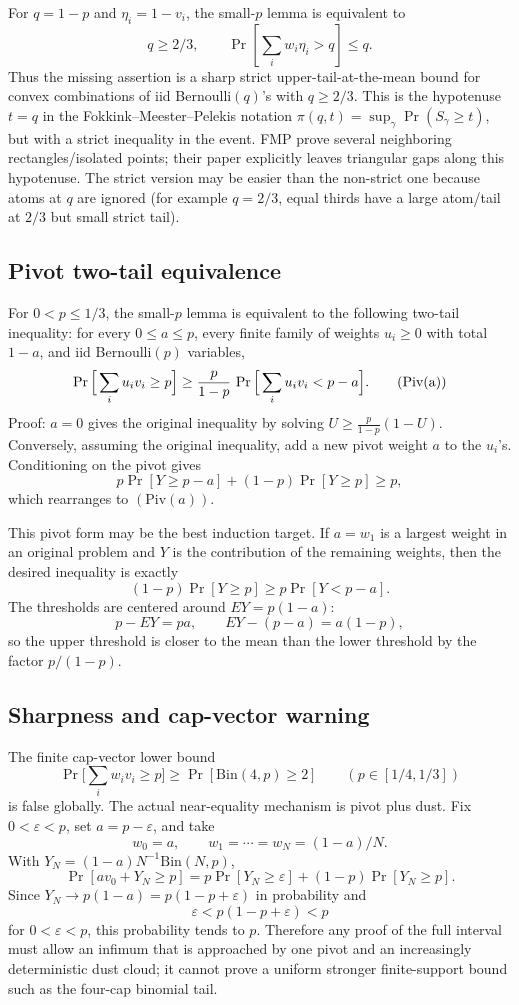 \documentclass[12pt]{article}
\begin{document}
For \(q=1-p\) and \(\eta_i=1-v_i\), the small-\(p\) lemma is equivalent to
\[
        q\ge 2/3,\qquad
        \Pr\!\left[\sum_i w_i\eta_i>q\right]\le q .
\]
Thus the missing assertion is a sharp strict upper-tail-at-the-mean bound for
convex combinations of iid Bernoulli\((q)\)'s with \(q\ge2/3\).  This is the
hypotenuse \(t=q\) in the Fokkink--Meester--Pelekis notation
\(\pi(q,t)=\sup_\gamma \Pr(S_\gamma\ge t)\), but with a strict inequality in
the event.  FMP prove several neighboring rectangles/isolated points; their
paper explicitly leaves triangular gaps along this hypotenuse.  The strict
version may be easier than the non-strict one because atoms at \(q\) are
ignored (for example \(q=2/3\), equal thirds have a large atom/tail at \(2/3\)
but small strict tail).

\subsection*{Pivot two-tail equivalence}

For \(0<p\le1/3\), the small-\(p\) lemma is equivalent to the following
two-tail inequality: for every \(0\le a\le p\), every finite family of weights
\(u_i\ge0\) with total \(1-a\), and iid Bernoulli\((p)\) variables,
\[
        \Pr\Big[\sum_i u_i v_i\ge p\Big]
        \ge {p\over 1-p}\,
        \Pr\Big[\sum_i u_i v_i<p-a\Big].        \tag{Piv(a)}
\]
Proof: \(a=0\) gives the original inequality by solving
\(U\ge\frac{p}{1-p}(1-U)\).  Conversely, assuming the original inequality,
add a new pivot weight \(a\) to the \(u_i\)'s.  Conditioning on the pivot gives
\[
p\Pr[Y\ge p-a]+(1-p)\Pr[Y\ge p]\ge p,
\]
which rearranges to \((\mathrm{Piv}(a))\).

This pivot form may be the best induction target.  If \(a=w_1\) is a largest
weight in an original problem and \(Y\) is the contribution of the remaining
weights, then the desired inequality is exactly
\[
(1-p)\Pr[Y\ge p]\ge p\Pr[Y<p-a].
\]
The thresholds are centered around \(E Y=p(1-a)\):
\[
p-EY=pa,\qquad EY-(p-a)=a(1-p),
\]
so the upper threshold is closer to the mean than the lower threshold by the
factor \(p/(1-p)\).

\subsection*{Sharpness and cap-vector warning}

The finite cap-vector lower bound
\[
\Pr\Big[\sum_i w_i v_i\ge p\Big]\ge
\Pr[\mathrm{Bin}(4,p)\ge2]\qquad (p\in[1/4,1/3])
\]
is false globally.  The actual near-equality mechanism is pivot plus dust.
Fix \(0<\varepsilon<p\), set \(a=p-\varepsilon\), and take
\[
        w_0=a,\qquad
        w_1=\cdots=w_N=(1-a)/N.
\]
With \(Y_N=(1-a)N^{-1}\mathrm{Bin}(N,p)\),
\[
\Pr[a v_0+Y_N\ge p]
 =
p\Pr[Y_N\ge\varepsilon]+(1-p)\Pr[Y_N\ge p].
\]
Since \(Y_N\to p(1-a)=p(1-p+\varepsilon)\) in probability and
\[
        \varepsilon<p(1-p+\varepsilon)<p
\]
for \(0<\varepsilon<p\), this probability tends to \(p\).  Therefore any proof
of the full interval must allow an infimum that is approached by one pivot and
an increasingly deterministic dust cloud; it cannot prove a uniform stronger
finite-support bound such as the four-cap binomial tail.
\end{document}
